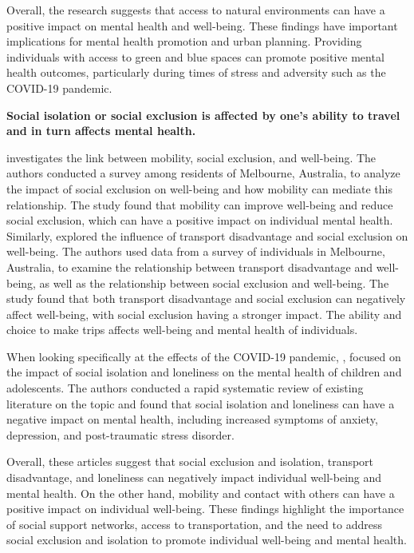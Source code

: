 \documentclass[
  letterpaper,
  authoryear]{elsarticle}
\begin{document}
Overall, the research suggests that access to natural environments can
have a positive impact on mental health and well-being. These findings
have important implications for mental health promotion and urban
planning. Providing individuals with access to green and blue spaces can
promote positive mental health outcomes, particularly during times of
stress and adversity such as the COVID-19 pandemic.

\textbf{Social isolation or social exclusion is affected by one's
ability to travel and in turn affects mental health.}

\citet{stanleyMobilitySocialExclusion2011} investigates the link between
mobility, social exclusion, and well-being. The authors conducted a
survey among residents of Melbourne, Australia, to analyze the impact of
social exclusion on well-being and how mobility can mediate this
relationship. The study found that mobility can improve well-being and
reduce social exclusion, which can have a positive impact on individual
mental health. Similarly, \citet{delboscExploringRelativeInfluences2011}
explored the influence of transport disadvantage and social exclusion on
well-being. The authors used data from a survey of individuals in
Melbourne, Australia, to examine the relationship between transport
disadvantage and well-being, as well as the relationship between social
exclusion and well-being. The study found that both transport
disadvantage and social exclusion can negatively affect well-being, with
social exclusion having a stronger impact. The ability and choice to
make trips affects well-being and mental health of individuals.

When looking specifically at the effects of the COVID-19 pandemic,
\citet{loadesRapidSystematicReview2020} , focused on the impact of
social isolation and loneliness on the mental health of children and
adolescents. The authors conducted a rapid systematic review of existing
literature on the topic and found that social isolation and loneliness
can have a negative impact on mental health, including increased
symptoms of anxiety, depression, and post-traumatic stress disorder.

Overall, these articles suggest that social exclusion and isolation,
transport disadvantage, and loneliness can negatively impact individual
well-being and mental health. On the other hand, mobility and contact
with others can have a positive impact on individual well-being. These
findings highlight the importance of social support networks, access to
transportation, and the need to address social exclusion and isolation
to promote individual well-being and mental health.
\end{document}
